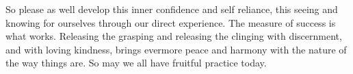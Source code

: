 \documentclass[12pt,openany]{book}
\begin{document}
So please as well develop this inner confidence and self reliance, this seeing and knowing for ourselves through our direct experience. The measure of success is what works. Releasing the grasping and releasing the clinging with discernment, and with loving kindness, brings evermore peace and harmony with the nature of the way things are. So may we all have fruitful practice today.


\begin{figure}[h]
    \centering
\end{figure}
\end{document}
